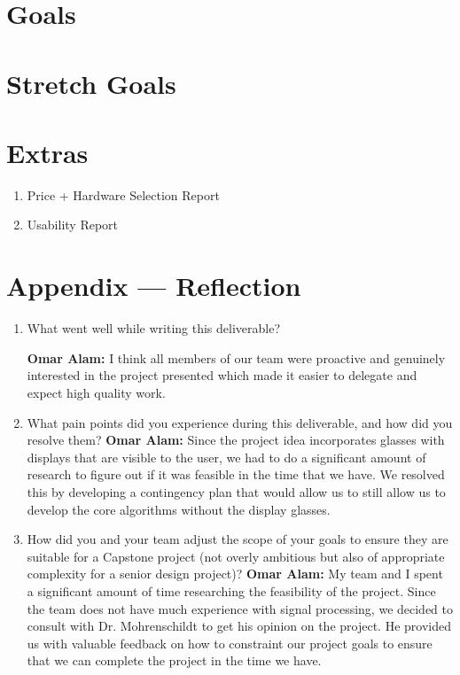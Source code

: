 \documentclass{article}
\begin{document}
\section{Goals}

\section{Stretch Goals}

\section{Extras}

\begin{enumerate}
    \item Price + Hardware Selection Report
    \item Usability Report
\end{enumerate} 

\newpage{}

\section*{Appendix --- Reflection}




\begin{enumerate}
    \item What went well while writing this deliverable? 
    
    \textbf{Omar Alam:} I think all members of our team were proactive and genuinely interested in the project presented which made it easier
    to delegate and expect high quality work. 
    \item What pain points did you experience during this deliverable, and how
    did you resolve them?
    \textbf{Omar Alam:} Since the project idea incorporates glasses with displays that are visible to the user, we had to do a significant amount
    of research to figure out if it was feasible in the time that we have. We resolved this by developing a contingency plan that would allow us to 
    still allow us to develop the core algorithms without the display glasses.
    \item How did you and your team adjust the scope of your goals to ensure
    they are suitable for a Capstone project (not overly ambitious but also of
    appropriate complexity for a senior design project)?
    \textbf{Omar Alam:} My team and I spent a significant amount of time researching the feasibility of the project. Since the team does not have much
    experience with signal processing, we decided to consult with Dr. Mohrenschildt to get his opinion on the project. He provided us with valuable feedback on how
    to constraint our project goals to ensure that we can complete the project in the time we have.
\end{enumerate}  
\end{document}
